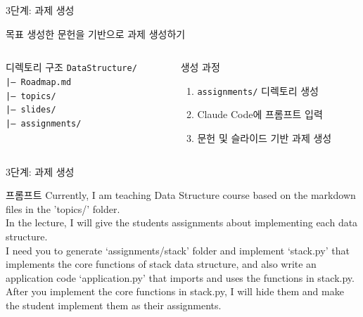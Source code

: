 \documentclass[aspectratio=169,xcolor=dvipsnames]{beamer}
\begin{document}
\begin{frame}{3단계: 과제 생성}
  \begin{block}{목표}
    생성한 문헌을 기반으로 과제 생성하기
  \end{block}


  \begin{columns}[t]
    \begin{column}{0.48\textwidth}
      \begin{exampleblock}{디렉토리 구조}
        \texttt{DataStructure/}\\
        \hspace{0.5cm}\texttt{|-- Roadmap.md}\\
        \hspace{0.5cm}\texttt{|-- topics/}\\
        \hspace{0.5cm}\texttt{|-- slides/}\\
        \hspace{0.5cm}\texttt{|-- assignments/}
      \end{exampleblock}
    \end{column}

    \begin{column}{0.48\textwidth}
      \begin{alertblock}{생성 과정}
        \begin{enumerate}
          \item \texttt{assignments/} 디렉토리 생성
          \item Claude Code에 프롬프트 입력
          \item 문헌 및 슬라이드 기반 과제 생성
        \end{enumerate}
      \end{alertblock}
    \end{column}
  \end{columns}

\end{frame}


\begin{frame}{3단계: 과제 생성}

  \begin{alertblock}{프롬프트}
    Currently, I am teaching Data Structure course based on the markdown files in the 'topics/' folder.\\\vspace{1em}
    In the lecture, I will give the students assignments about implementing each data structure. \\\vspace{1em}
    I need you to generate ‘assignments/stack’ folder and implement ‘stack.py’ that implements the core functions of stack data structure, and also write an application code ‘application.py’ that imports and uses the functions in stack.py.\\\vspace{1em}
    After you implement the core functions in stack.py, I will hide them and make the student implement them as their assignments.
  \end{alertblock}
\end{frame}
\end{document}
